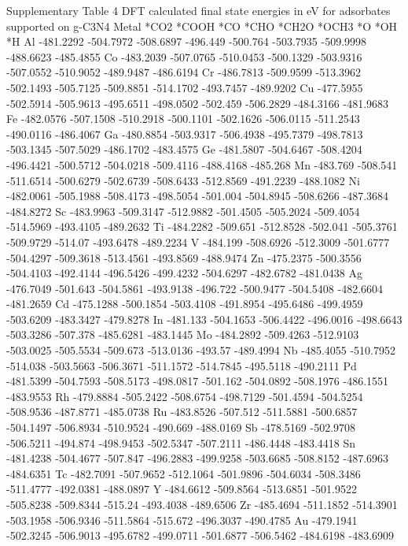 Supplementary Table 4
DFT calculated final state energies in eV for adsorbates supported on g-C3N4
Metal	*CO2	*COOH	*CO	*CHO	*CH2O	*OCH3	*O	*OH	*H
Al	-481.2292	-504.7972	-508.6897	-496.449	-500.764	-503.7935	-509.9998	-488.6623	-485.4855
Co	-483.2039	-507.0765	-510.0453	-500.1329	-503.9316	-507.0552	-510.9052	-489.9487	-486.6194
Cr	-486.7813	-509.9599	-513.3962	-502.1493	-505.7125	-509.8851	-514.1702	-493.7457	-489.9202
Cu	-477.5955	-502.5914	-505.9613	-495.6511	-498.0502	-502.459	-506.2829	-484.3166	-481.9683
Fe	-482.0576	-507.1508	-510.2918	-500.1101	-502.1626	-506.0115	-511.2543	-490.0116	-486.4067
Ga	-480.8854	-503.9317	-506.4938	-495.7379	-498.7813	-503.1345	-507.5029	-486.1702	-483.4575
Ge	-481.5807	-504.6467	-508.4204	-496.4421	-500.5712	-504.0218	-509.4116	-488.4168	-485.268
Mn	-483.769	-508.541	-511.6514	-500.6279	-502.6739	-508.6433	-512.8569	-491.2239	-488.1082
Ni	-482.0061	-505.1988	-508.4173	-498.5054	-501.004	-504.8945	-508.6266	-487.3684	-484.8272
Sc	-483.9963	-509.3147	-512.9882	-501.4505	-505.2024	-509.4054	-514.5969	-493.4105	-489.2632
Ti	-484.2282	-509.651	-512.8528	-502.041	-505.3761	-509.9729	-514.07	-493.6478	-489.2234
V	-484.199	-508.6926	-512.3009	-501.6777	-504.4297	-509.3618	-513.4561	-493.8569	-488.9474
Zn	-475.2375	-500.3556	-504.4103	-492.4144	-496.5426	-499.4232	-504.6297	-482.6782	-481.0438
Ag	-476.7049	-501.643	-504.5861	-493.9138	-496.722	-500.9477	-504.5408	-482.6604	-481.2659
Cd	-475.1288	-500.1854	-503.4108	-491.8954	-495.6486	-499.4959	-503.6209	-483.3427	-479.8278
In	-481.133	-504.1653	-506.4422	-496.0016	-498.6643	-503.3286	-507.378	-485.6281	-483.1445
Mo	-484.2892	-509.4263	-512.9103	-503.0025	-505.5534	-509.673	-513.0136	-493.57	-489.4994
Nb	-485.4055	-510.7952	-514.038	-503.5663	-506.3671	-511.1572	-514.7845	-495.5118	-490.2111
Pd	-481.5399	-504.7593	-508.5173	-498.0817	-501.162	-504.0892	-508.1976	-486.1551	-483.9553
Rh	-479.8884	-505.2422	-508.6754	-498.7129	-501.4594	-504.5254	-508.9536	-487.8771	-485.0738
Ru	-483.8526	-507.512	-511.5881	-500.6857	-504.1497	-506.8934	-510.9524	-490.669	-488.0169
Sb	-478.5169	-502.9708	-506.5211	-494.874	-498.9453	-502.5347	-507.2111	-486.4448	-483.4418
Sn	-481.4238	-504.4677	-507.847	-496.2883	-499.9258	-503.6685	-508.8152	-487.6963	-484.6351
Tc	-482.7091	-507.9652	-512.1064	-501.9896	-504.6034	-508.3486	-511.4777	-492.0381	-488.0897
Y	-484.6612	-509.8564	-513.6851	-501.9522	-505.8238	-509.8344	-515.24	-493.4038	-489.6506
Zr	-485.4694	-511.1852	-514.3901	-503.1958	-506.9346	-511.5864	-515.672	-496.3037	-490.4785
Au	-479.1941	-502.3245	-506.9013	-495.6782	-499.0711	-501.6877	-506.5462	-484.6198	-483.6909
